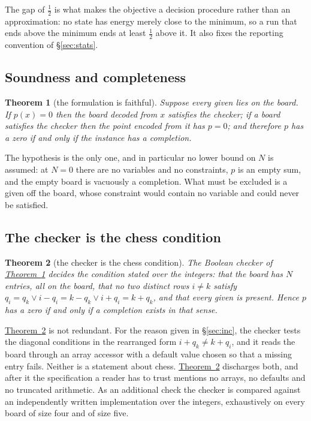 \documentclass{easychair}
\newtheorem{thm}{Theorem}[section]
\newcommand{\secref}[1]{\hyperref[#1]{\textcolor{academicpurple}{\S\ref*{#1}}}}
\newcommand{\thmref}[1]{\textcolor{academicpurple}{\hyperref[#1]{Theorem~\ref*{#1}}}}
\begin{document}
The gap of $\tfrac12$ is what makes the objective a decision procedure rather than an approximation:
no state has energy merely close to the minimum, so a run that ends above the minimum ends at least
$\tfrac12$ above it. It also fixes the reporting convention of \secref{sec:stats}.

\subsection{Soundness and completeness}\label{sec:iff}

\begin{thm}[the formulation is faithful]\label{thm:iff}
Suppose every given lies on the board. If $p(x) = 0$ then the board decoded from $x$ satisfies the
checker; if a board satisfies the checker then the point encoded from it has $p = 0$; and therefore
$p$ has a zero if and only if the instance has a completion.
\end{thm}

The hypothesis is the only one, and in particular no lower bound on $N$ is assumed: at $N = 0$ there
are no variables and no constraints, $p$ is an empty sum, and the empty board is vacuously a
completion. What must be excluded is a given off the board, whose constraint would contain no
variable and could never be satisfied.

\subsection{The checker is the chess condition}\label{sec:spec}

\begin{thm}[the checker is the chess condition]\label{thm:spec}
The Boolean checker of \thmref{thm:iff} decides the condition stated over the integers: that the
board has $N$ entries, all on the board, that no two distinct rows $i \neq k$ satisfy
$q_i = q_k \vee i - q_i = k - q_k \vee i + q_i = k + q_k$, and that every given is present. Hence
$p$ has a zero if and only if a completion exists in that sense.
\end{thm}

\thmref{thm:spec} is not redundant. For the reason given in \secref{sec:inc}, the checker tests the
diagonal conditions in the rearranged form $i + q_k \neq k + q_i$, and it reads the board through an
array accessor with a default value chosen so that a missing entry fails. Neither is a statement
about chess. \thmref{thm:spec} discharges both, and after it the specification a reader has to trust
mentions no arrays, no defaults and no truncated arithmetic. As an additional check the checker is
compared against an independently written implementation over the integers, exhaustively on every
board of size four and of size five.
\end{document}
